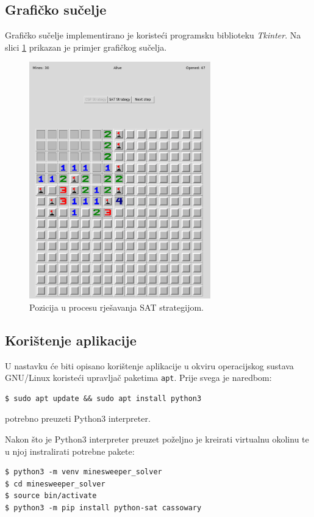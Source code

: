 \documentclass{article}
\numberwithin{figure}{section}
\numberwithin{table}{section}
\begin{document}
\subsection{Grafičko sučelje}

Grafičko sučelje implementirano je koristeći programsku biblioteku \textit{Tkinter}. Na slici \ref{img:GUI} prikazan je primjer grafičkog sučelja.

\begin{figure}[ht]
    \centering
    \includegraphics[width=0.7\textwidth]{images/gui.png}
    \caption{Pozicija u procesu rješavanja SAT strategijom.}
    \label{img:GUI}
\end{figure}

\subsection{Korištenje aplikacije}

U nastavku će biti opisano korištenje aplikacije u okviru operacijskog sustava GNU/Linux
koristeći upravljač paketima \texttt{apt}. Prije svega je naredbom:
\begin{verbatim}
$ sudo apt update && sudo apt install python3
\end{verbatim}
potrebno preuzeti Python3 interpreter.

Nakon što je Python3 interpreter preuzet poželjno je kreirati virtualnu okolinu te u njoj
instralirati potrebne pakete:
\begin{verbatim}
$ python3 -m venv minesweeper_solver
$ cd minesweeper_solver
$ source bin/activate
$ python3 -m pip install python-sat cassowary
\end{verbatim}
\end{document}
